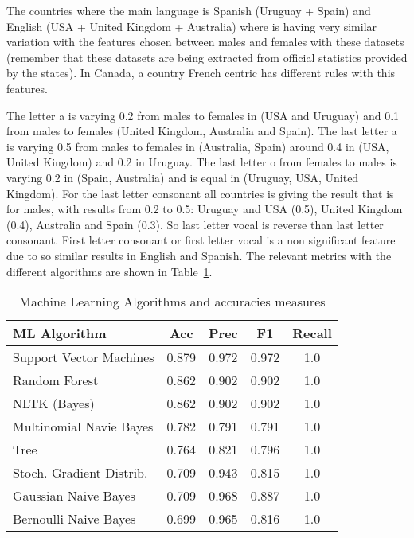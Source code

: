 \documentclass[a4paper]{article}
\begin{document}
The countries where the main language is Spanish (Uruguay + Spain) and English (USA + United Kingdom + Australia) where is having very similar variation with the features chosen between males and females with these datasets (remember that these datasets are being extracted from official statistics provided by the states). 
In Canada, a country French centric has different rules with this features.

The letter a is varying 0.2 from males to females in (USA and Uruguay) and 0.1 from males to females (United Kingdom, Australia and Spain).
The last letter a is varying 0.5 from males to females in (Australia, Spain) around 0.4 in (USA, United Kingdom) and 0.2 in
Uruguay.
The last letter o from females to males is varying 0.2 in (Spain, Australia) and is equal in (Uruguay, USA, United Kingdom).
For the last letter consonant all countries is giving the result that is for males, with results from 0.2 to 0.5: Uruguay and USA (0.5), United Kingdom (0.4), Australia and Spain (0.3). 
So last letter vocal is reverse than last letter consonant. 
First letter consonant or first letter vocal is a non significant feature due to so similar results in English and Spanish.
The relevant metrics with the different algorithms are shown in Table~\ref{table:MLAccuracies}.

\begin{table}
\footnotesize
\begin{tabular}[]{lcccc}
  \hline
  ML Algorithm & Acc & Prec & F1 & Recall \tabularnewline
  \hline
 Support Vector Machines             &    0.879 &     0.972 &   0.972 &    1.0  \tabularnewline
 Random Forest                       &    0.862 &     0.902 &   0.902 &    1.0  \tabularnewline
 NLTK (Bayes)                        &    0.862 &     0.902 &   0.902 &    1.0  \tabularnewline
 Multinomial Navie Bayes             &    0.782 &     0.791 &   0.791 &    1.0  \tabularnewline
 Tree                                &    0.764 &     0.821 &   0.796 &    1.0  \tabularnewline
 Stoch. Gradient Distrib.    &    0.709 &     0.943 &   0.815 &    1.0  \tabularnewline
 Gaussian Naive Bayes                &    0.709 &     0.968 &   0.887 &    1.0  \tabularnewline
 Bernoulli Naive Bayes               &    0.699 &     0.965 &   0.816 &    1.0  \tabularnewline
 
\hline
\end{tabular}
\caption{Machine Learning Algorithms and accuracies measures}
\label{table:MLAccuracies}
\end{table}
\end{document}

